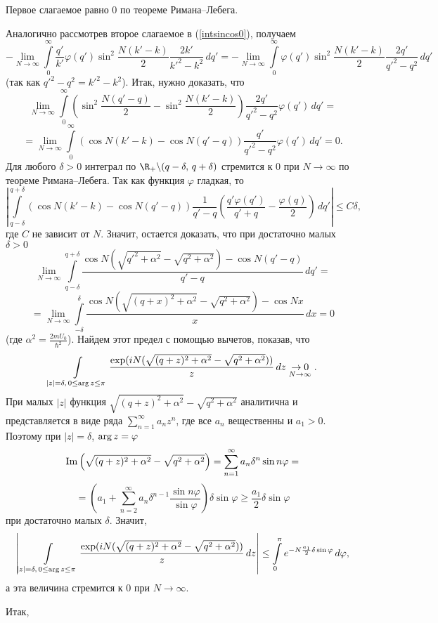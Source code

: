 \documentclass[a4paper
]{article}
\begin{document}
Первое слагаемое равно 0 по теореме Римана--Лебега. \par
Аналогично рассмотрев второе слагаемое в (\ref{intsincos0}),
получаем
$$-\lim\limits_{N\rightarrow\infty}\int \limits_0^\infty \frac{q'}{k'}
\varphi(q')\sin^2\frac{N(k'-k)}{2}\frac{2k'}{k'^2-k^2}\, dq'=
-\lim\limits_{N\rightarrow\infty}\int \limits_0^\infty \varphi(q')
\sin^2\frac{N(k'-k)}{2}\frac{2q'}{q'^2-q^2}\, dq'$$ (так как $q'^2-q^2=
k'^2-k^2$). Итак, нужно доказать, что $$\lim\limits_{N\rightarrow \infty}
\int \limits_0^\infty \left(\sin^2\frac{N(q'-q)}{2}-\sin^2\frac{N(k'-k)}{2}
\right)\frac{2q'}{q'^2-q^2}\varphi(q')\, dq'=$$ $$=\lim\limits_{N
\rightarrow \infty}\int \limits_0^\infty(\cos N(k'-k)-\cos N(q'-q))
\frac{q'}{q'^2-q^2}\varphi(q')\, dq'=0.$$
Для любого $\delta>0$ интеграл по $\R_+\backslash (q-\delta , \, q+\delta)$
стремится к 0 при $N\rightarrow \infty$ по теореме Римана--Лебега.
Так как функция $\varphi$ гладкая, то $$\left|\int \limits_{q-\delta}
^{q+\delta}(\cos N(k'-k)-\cos N(q'-q))\frac{1}{q'-q}\left(\frac{q'\varphi(q')}
{q'+q}-\frac{\varphi(q)}{2}\right)\, dq'\right|\le C\delta,$$ где
$C$ не зависит от $N$. Значит, остается доказать, что при достаточно малых
$\delta>0$ $$\lim \limits_{N\rightarrow \infty}\int \limits_{q-\delta}^{q+\delta}
\frac{\cos N(\sqrt{q'^2+\alpha^2}-\sqrt{q^2+\alpha^2})-\cos N(q'-q)}{q'-q}\, dq'=$$
$$=\lim \limits _{N\rightarrow \infty}\int \limits_{-\delta}^{\delta}\frac{\cos
N(\sqrt{(q+x)^2+\alpha^2}-\sqrt{q^2+\alpha^2})-\cos Nx}{x}\, dx=0$$
(где $\alpha^2=\frac{2mU_0}{\hbar^2}$). Найдем этот предел с помощью вычетов,
показав, что $$\int \limits _{|z|=\delta, \, 0\le {\rm arg}\, z\le \pi}
\frac{\exp(iN(\sqrt{(q+z)^2+\alpha^2}-\sqrt{q^2+\alpha^2}))}{z}\, dz
\underset{N\rightarrow \infty}{\rightarrow 0}.$$ При малых $|z|$ функция
$\sqrt{(q+z)^2+\alpha^2}-\sqrt{q^2+\alpha^2}$ аналитична и представляется
в виде ряда $\sum \limits_{n=1}^\infty a_nz^n$, где все $a_n$
вещественны и $a_1>0$. Поэтому при $|z|=\delta$, ${\rm arg}\, z=\varphi$
$${\rm Im}\left(\sqrt{(q+z)^2+\alpha^2}-\sqrt{q^2+\alpha^2}\right)=
\sum \limits_{n=1}^\infty
a_n\delta^n\sin{n\varphi}=$$ $$=\left(a_1+ \sum
\limits_{n=2}^\infty a_n\delta^{n-1}\frac{\sin n\varphi}{\sin
\varphi}\right)\delta \sin \varphi\ge \frac{a_1}{2}\delta \sin
\varphi$$ при достаточно малых $\delta$. Значит, $$\left|\int
\limits_{|z|=\delta, \, 0\le {\rm arg}\, z\le
\pi}\frac{\exp(iN(\sqrt{(q+z)^2+\alpha^2}-
\sqrt{q^2+\alpha^2}))}{z}\, dz\right|\le \int \limits_0^\pi
e^{-N\frac {a_1}{2}\delta\sin \varphi}\, d\varphi,$$ а эта
величина стремится к 0 при $N\rightarrow \infty$. \par Итак,
\end{document}
